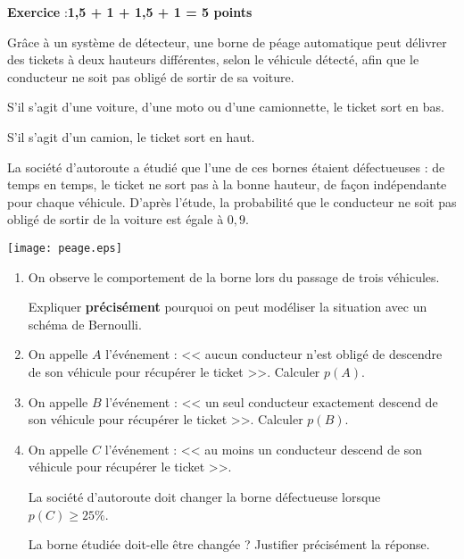 \documentclass[10pt,french]{book}
\newcounter{exoc}
\newenvironment{exoc}[1]{%
  \refstepcounter{exoc}\textbf{Exercice \theexoc} :\hfill {\textbf{#1}}\par
  \medskip}%
{\medskip}
\begin{document}
\begin{exoc}{1,5 + 1 + 1,5 + 1 = 5 points}
\begin{minipage}{0.7\linewidth}
    Grâce à un système de détecteur, une borne de péage automatique peut délivrer des tickets à deux hauteurs différentes, selon le véhicule détecté, afin que le conducteur ne soit pas obligé de sortir de sa voiture.\par
    S'il s'agit d'une voiture, d'une moto ou d'une camionnette, le ticket sort en bas.\par S'il s'agit d'un camion, le ticket sort en haut.\par
    La société d'autoroute a étudié que l'une de ces bornes étaient défectueuses : de temps en temps, le ticket ne sort pas à la bonne hauteur, de façon indépendante pour chaque véhicule. D'après l'étude, la probabilité que le conducteur ne soit pas obligé de sortir de la voiture est égale à $0,9$.
\end{minipage}\qquad
\begin{minipage}{0.25\linewidth}
    \texttt{[image: peage.eps]}
\end{minipage}

    \begin{enumerate}
        \item On observe le comportement de la borne lors du passage de trois véhicules.\par Expliquer \textbf{précisément} pourquoi on peut modéliser la situation avec un schéma de Bernoulli.
        \item On appelle $A$ l'événement : << aucun conducteur n'est obligé de descendre de son véhicule pour récupérer le ticket >>. Calculer $p(A)$.
        \item On appelle $B$ l'événement : << un seul conducteur exactement descend de son véhicule pour récupérer le ticket >>. Calculer $p(B)$.
        \item On appelle $C$ l'événement : << au moins un conducteur descend de son véhicule pour récupérer le ticket >>.\par
        La société d'autoroute doit changer la borne défectueuse lorsque $p(C) \geqslant 25\%$.\par
        La borne étudiée doit-elle être changée ? Justifier précisément la réponse.
    \end{enumerate}
\end{exoc}
\end{document}
